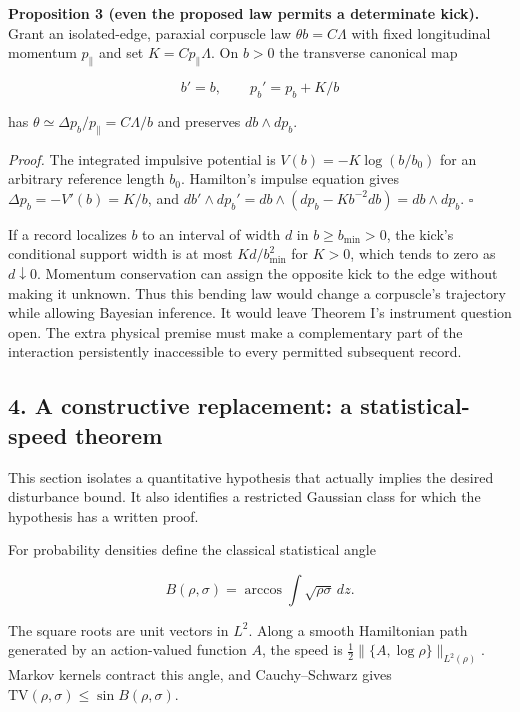 \documentclass[11pt,a4paper]{article}
\begin{document}
\textbf{Proposition 3 (even the proposed law permits a determinate
kick).} Grant an isolated-edge, paraxial corpuscle law
\(\theta b=C\Lambda\) with fixed longitudinal momentum \(p_\parallel\)
and set \(K=Cp_\parallel\Lambda\). On \(b>0\) the transverse canonical
map

\[b'=b,\qquad p_b'=p_b+K/b \tag{6}\]

has \(\theta\simeq\Delta p_b/p_\parallel=C\Lambda/b\) and preserves
\(db\wedge dp_b\).

\emph{Proof.} The integrated impulsive potential is
\(V(b)=-K\log(b/b_0)\) for an arbitrary reference length \(b_0\).
Hamilton's impulse equation gives \(\Delta p_b=-V'(b)=K/b\), and
\(db'\wedge dp_b'=db\wedge(dp_b-Kb^{-2}db)=db\wedge dp_b\). \(\square\)

If a record localizes \(b\) to an interval of width \(d\) in
\(b\ge b_{\min}>0\), the kick's conditional support width is at most
\(Kd/b_{\min}^2\) for \(K>0\), which tends to zero as \(d\downarrow0\).
Momentum conservation can assign the opposite kick to the edge without
making it unknown. Thus this bending law would change a corpuscle's
trajectory while allowing Bayesian inference. It would leave Theorem I's
instrument question open. The extra physical premise must make a
complementary part of the interaction persistently inaccessible to every
permitted subsequent record.

\hypertarget{a-constructive-replacement-a-statistical-speed-theorem}{%
\subsection{4. A constructive replacement: a statistical-speed
theorem}\label{a-constructive-replacement-a-statistical-speed-theorem}}

This section isolates a quantitative hypothesis that actually implies
the desired disturbance bound. It also identifies a restricted Gaussian
class for which the hypothesis has a written proof.

For probability densities define the classical statistical angle

\[B(\rho,\sigma)=\arccos\int\sqrt{\rho\sigma}\,dz.\]

The square roots are unit vectors in \(L^2\). Along a smooth Hamiltonian
path generated by an action-valued function \(A\), the speed is
\(\frac12\|\{A,\log\rho\}\|_{L^2(\rho)}\). Markov kernels contract this
angle, and Cauchy--Schwarz gives
\(\mathrm{TV}(\rho,\sigma)\le\sin B(\rho,\sigma)\).
\end{document}
